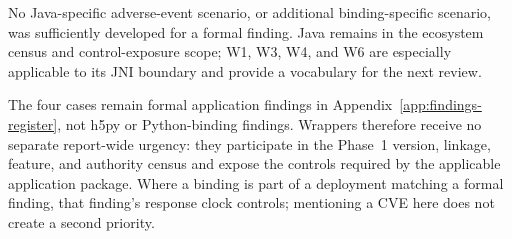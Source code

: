 \documentclass[../main.tex]{subfiles}
\begin{document}
No Java-specific adverse-event scenario, or additional binding-specific
scenario, was sufficiently developed for a formal finding. Java remains in the
ecosystem census and control-exposure scope; W1, W3, W4, and W6 are especially
applicable to its JNI boundary and provide a vocabulary for the next review.

The four cases remain formal application findings in
Appendix~\ref{app:findings-register}, not h5py or Python-binding findings.
Wrappers therefore receive no separate report-wide urgency: they participate
in the Phase~1 version, linkage, feature, and authority census and expose the
controls required by the applicable application package. Where a binding is
part of a deployment matching a formal finding, that finding's response clock
controls; mentioning a CVE here does not create a second priority.
\end{document}
